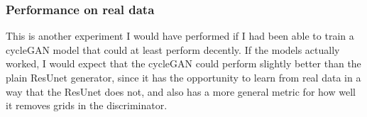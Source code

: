 \subsubsection{Performance on real data}
This is another experiment I would have performed if I had been able to train a cycleGAN model that could at least perform decently. If the models actually worked, I would expect that the cycleGAN could perform slightly better than the plain ResUnet generator, since it has the opportunity to learn from real data in a way that the ResUnet does not, and also has a more general metric for how well it removes grids in the discriminator.
